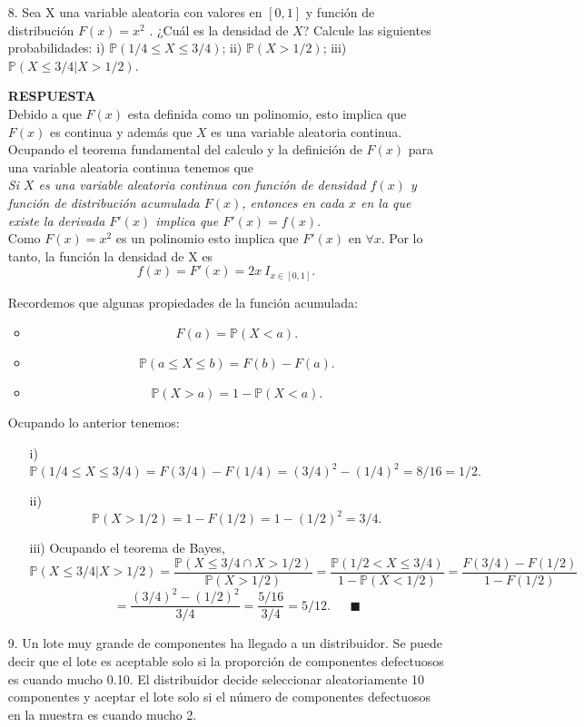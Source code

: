 \documentclass[11pt,letterpaper]{article}
\newcommand{\mP}{\mathbb{P}}
\newcommand{\res}{\textbf{RESPUESTA}\\}
\begin{document}
\begin{itemize}
\item[8.] Sea X una variable aleatoria con valores en $[0, 1]$ y función de distribución $F(x)=x^2$ . ¿Cuál es
la densidad de $X$? Calcule las siguientes probabilidades: i) $\mP (1/4 \leq X \leq 3/4)$; ii) $\mP (X > 1/2)$;
iii) $\mP (X \leq 3/4|X > 1/2)$.

\res
Debido a que $F(x)$ esta definida como un polinomio, esto implica que $F(x)$ es continua y además que $X$ es una variable aleatoria continua. Ocupando el teorema fundamental del calculo y la definición de $F(x)$ para una variable aleatoria continua tenemos que\\ 

\textit{Si $X$ es una variable aleatoria continua con función de densidad $f(x)$ y función de distribución acumulada $F(x)$, entonces en cada $x$ en la que existe la derivada $F'(x)$ implica que $F'(x)=f(x).$}\\

Como $F(x)=x^2$ es un polinomio esto implica que $F'(x)$ en $\forall x$. Por lo tanto, la función la densidad de X es
$$f(x)=F'(x)=2x \ I_{x\in [0,1]}.$$

Recordemos que algunas propiedades de la función acumulada:
\begin{itemize}
\item $$F(a)=\mP(X<a).$$
\item $$\mP (a\leq X\leq b)= F(b)-F(a). $$
\item $$\mP(X>a)=1-\mP(X<a).$$
\end{itemize}
Ocupando lo anterior tenemos:
\begin{itemize}
\item[i)] 
$$\mP (1/4 \leq X \leq 3/4)= F(3/4)-F(1/4)= (3/4)^2-(1/4)^2=8/16=1/2.$$ 
\item[ii)]$$\mP(X > 1/2)= 1-F(1/2)=1-(1/2)^2=3/4.$$
\item[iii)]Ocupando el teorema de Bayes,
$$\mP(X \leq 3/4|X > 1/2)=\frac{\mP(X\leq 3/4 \cap X>1/2)}{\mP(X>1/2)}=\frac{\mP(1/2<X\leq3/4)}{1-\mP(X<1/2)}=\frac{F(3/4)-F(1/2)}{1-F(1/2)}$$
$$=\frac{(3/4)^2-(1/2)^2}{3/4} =\frac{5/16}{3/4}=5/12. \ \ \ \ \ \ \  \blacksquare$$
\end{itemize}

\item[9.] Un lote muy grande de componentes ha llegado a un distribuidor. Se puede decir que el
lote es aceptable solo si la proporción de componentes defectuosos es cuando mucho 0.10.
El distribuidor decide seleccionar aleatoriamente 10 componentes y aceptar el lote solo si el
número de componentes defectuosos en la muestra es cuando mucho 2.


\end{itemize}
\end{document}
